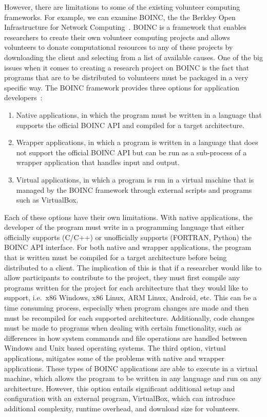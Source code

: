 \documentclass[11pt]{article}
\begin{document}
However, there are limitations to some of the existing volunteer computing frameworks. For example, we can examine BOINC, the the Berkley Open Infrastructure for Network Computing~\cite{Anderson2020}. BOINC is a framework that enables researchers to create their own volunteer computing projects and allows volunteers to donate computational resources to any of these projects by downloading the client and selecting from a list of available causes. One of the big issues when it comes to creating a research project on BOINC is the fact that programs that are to be distributed to volunteers must be packaged in a very specific way. The BOINC framework provides three options for application developers~\cite{boincAppsIntro}:

\begin{enumerate}
    \item Native applications, in which the program must be written in a language that supports the official BOINC API and compiled for a target architecture.
    \item Wrapper applications, in which a program is written in a language that does not support the official BOINC API but can be run as a sub-process of a wrapper application that handles input and output.
    \item Virtual applications, in which a program is run in a virtual machine that is managed by the BOINC framework through external scripts and programs such as VirtualBox.
\end{enumerate}

Each of these options have their own limitations. With native applications, the developer of the program must write in a programming language that either officially supports (C/C++) or unofficially supports (FORTRAN, Python) the BOINC API interface. For both native and wrapper applications, the program that is written must be compiled for a target architecture before being distributed to a client. The implication of this is that if a researcher would like to allow participants to contribute to the project, they must first compile any programs written for the project for each architecture that they would like to support, i.e.\ x86 Windows, x86 Linux, ARM Linux, Android, etc. This can be a time consuming process, especially when program changes are made and then must be recompiled for each supported architecture. Additionally, code changes must be made to programs when dealing with certain functionality, such as differences in how system commands and file operations are handled between Windows and Unix based operating systems. The third option, virtual applications, mitigates some of the problems with native and wrapper applications. These types of BOINC applications are able to execute in a virtual machine, which allows the program to be written in any language and run on any architecture. However, this option entails significant additional setup and configuration with an external program, VirtualBox, which can introduce additional complexity, runtime overhead, and download size for volunteers.
\end{document}
